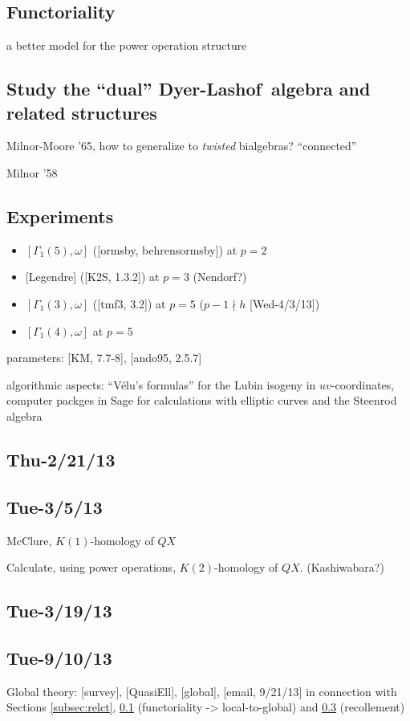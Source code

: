 \documentclass{rs}
\theoremstyle{definition}
\theoremstyle{remark}
\newcommand{\DL}{Dyer-Lashof~}
\newcommand{\G}{\Gamma}
\renewcommand{\=}{\approx}
\renewcommand{\-}{\sim}
\numberwithin{equation}{section}
\numberwithin{thm}{section}
\begin{document}
\subsection{Functoriality}
\label{subsec:fcr}

a better model for the power operation structure 


\subsection{Study the ``dual'' \DL algebra and related structures}

Milnor-Moore '65, how to generalize to {\em twisted} bialgebras?  ``connected'' 

Milnor '58 


\subsection{Experiments}
\label{subsec:exp}

\begin{itemize}
 \item $[\G_1(5), \omega]$ ([ormsby, behrensormsby]) at $p=2$ 

 \item {[Legendre]} ([K2S, 1.3.2]) at $p=3$ (Nendorf?) 

 \item $[\G_1(3), \omega]$ ([tmf3, 3.2]) at $p=5$ ($p-1 \nmid h$ [Wed-4/3/13]) 

 \item $[\G_1(4), \omega]$ at $p=5$ 
\end{itemize}

parameters: [KM, 7.7-8], [ando95, 2.5.7] 

algorithmic aspects: ``V\'elu's formulas'' for the Lubin isogeny in $uv$-coordinates, 
computer packges in Sage for calculations with elliptic curves and the Steenrod algebra 


\subsection{Thu-2/21/13}


\subsection{Tue-3/5/13}

McClure, $K(1)$-homology of $QX$ 

Calculate, using power operations, $K(2)$-homology of $QX$.  (Kashiwabara?) 


\subsection{Tue-3/19/13}


\subsection{Tue-9/10/13}

Global theory: [survey], [QuasiEll], [global], [email, 9/21/13] 
in connection with Sections \ref{subsec:relct}, \ref{subsec:fcr} (functoriality -> local-to-global) and \ref{subsec:exp} (recollement) 
\end{document}
